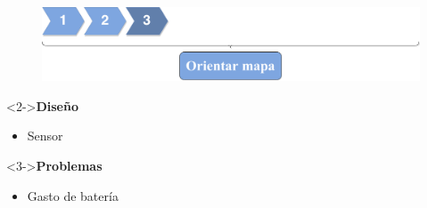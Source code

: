 \begin{slide}
  \begin{center}
    \begin{figure}[!h]
      \includegraphics[height=0.27\textheight]{img/ite3.png}
    \end{figure}
    \vspace{0.5cm}
    \begin{minipage}[b]{0.4\linewidth}
      \begin{block}<2->{\textbf{Diseño}}
        \begin{itemize}
          \item Sensor
        \end{itemize}
      \end{block}
    \end{minipage}
    \hspace{0.5cm}
    \begin{minipage}[b]{0.4\linewidth}
      \begin{block}<3->{\textbf{Problemas}}
        \begin{itemize}
          \item Gasto de batería
        \end{itemize}
      \end{block}
    \end{minipage}
  \end{center}
\end{slide}

